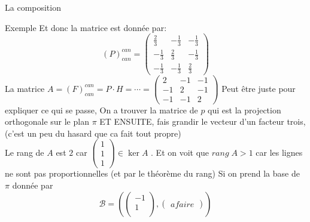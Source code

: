 \begin{parag}{La composition}
\begin{subparag}{Exemple}
        Et donc la matrice est donnée par:
\[(P)_{can}^{can} = \begin{pmatrix}
     \frac{2}{3} & -\frac{1}{3} & -\frac{1}{3}\\
      -\frac{1}{3}& \frac{2}{3} & -\frac{1}{3}\\
      -\frac{1}{3}& -\frac{1}{3} & \frac{2}{3}
\end{pmatrix}\]
La matrice $A = (F)_{can}^{can} = P \cdot H = \cdots = \begin{pmatrix}
    2 & -1 & -1 \\
    -1 & 2 & -1 \\
    -1 & -1 & 2
\end{pmatrix}$
Peut être juste pour expliquer ce qui se passe,  On a trouver la matrice de $p$ qui est la projection orthogonale sur le plan $\pi$ ET ENSUITE, fais grandir le vecteur d'un facteur trois, (c'est un peu du hasard que ca fait tout propre)
\\
Le rang de $A$ est $2$ car $\begin{pmatrix}
    1 \\ 1 \\ 1
\end{pmatrix} \in \ker A$ . Et on voit que $rang\; A > 1$ car les lignes ne sont pas proportionnelles (et par le théorème du rang)
Si on prend la base de $\pi$ donnée par
\[\mathcal{B} = \left( \begin{pmatrix}
    -1 \\ 1 \\ 
\end{pmatrix}, \begin{pmatrix}
    a faire
\end{pmatrix}\right)\]
    \end{subparag}
\end{parag}

